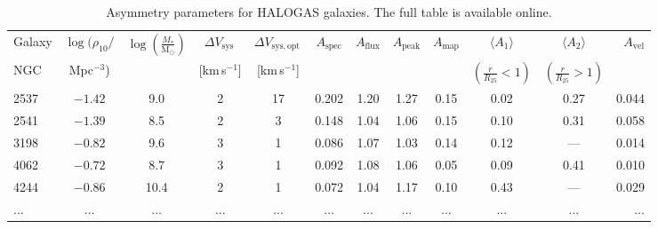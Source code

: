 \documentclass[fleqn,usenatbib]{mnras}
\begin{document}
\begin{table}
	\centering
    \caption{Asymmetry parameters for HALOGAS galaxies. The full table is available online.}
	\label{table:param_halogas}
	\begin{tabular}{lccccccccccr}
	    \\ \hline
        Galaxy & $\log(\rho_{10}/$ & $\log\left(\frac{M_*}{\mathrm{M}_{\mathrm{\odot}}}\right)$ & $\Delta V_{\mathrm{sys}}$\, & $\Delta V_{\mathrm{sys,opt}}$\, & $A_{\mathrm{spec}}$ & $A_{\mathrm{flux}}$ & $A_{\mathrm{peak}}$ & $A_{\mathrm{map}}$ & $\langle A_{1}\rangle$ & $\langle A_{2}\rangle$ & $A_{\mathrm{vel}}$ \\
        NGC & Mpc$^{-3}$) & & [km\,s$^{-1}$] & [km\,s$^{-1}$] & & & & & $\left(\frac{r}{R_{25}}<1\right)$ & $\left(\frac{r}{R_{25}}>1\right)$ & \\ \hline
        2537 & $-1.42$ & 9.0 & 2 & 17 & 0.202 & 1.20 & 1.27 & 0.15 & 0.02 & 0.27 & 0.044 \\ 
        2541 & $-1.39$ & 8.5 & 2 & 3 & 0.148 & 1.04 & 1.06 & 0.15 & 0.10 & 0.31 & 0.058 \\ 
        3198 & $-0.82$ & 9.6 & 3 & 1 & 0.086 & 1.07 & 1.03 & 0.14 & 0.12 & --- & 0.014 \\ 
        4062 & $-0.72$ & 8.7 & 3 & 1 & 0.092 & 1.08 & 1.06 & 0.05 & 0.09 & 0.41 & 0.010 \\ 
        4244 & $-0.86$ & 10.4 & 2 & 1 & 0.072 & 1.04 & 1.17 & 0.10 & 0.43 & --- & 0.029 \\ 
        ... & ... & ... & ... & ... & ... & ... & ... & ... & ... & ... & ... \\ \hline 
	\end{tabular}
\end{table}



\bsp	%
\label{lastpage}
\end{document}
